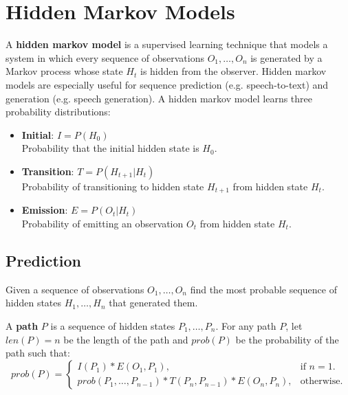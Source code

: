\documentclass[../main.tex]{subfiles}
\begin{document}
\section{Hidden Markov Models}

\begin{definition}
A \textbf{hidden markov model} is a supervised learning technique that models a system in which every sequence of observations $O_1, \ldots, O_n$ is generated by a Markov process whose state $H_t$ is hidden from the observer. Hidden markov models are especially useful for sequence prediction (e.g. speech-to-text) and generation (e.g. speech generation). A hidden markov model learns three probability distributions:

\begin{itemize}
    \item \textbf{Initial}: $I = P(H_0)$ \\
    Probability that the initial hidden state is $H_0$.
    \item \textbf{Transition}: $T = P(H_{t+1} | H_{t})$ \\
    Probability of transitioning to hidden state $H_{t+1}$ from hidden state $H_t$.
    \item \textbf{Emission}: $E = P(O_{t} | H_{t})$ \\
    Probability of emitting an observation $O_{t}$ from hidden state $H_{t}$.
\end{itemize}

\end{definition}

\subsection{Prediction}
Given a sequence of observations $O_1, \ldots, O_n$ find the most probable sequence of hidden states $H_1, \ldots, H_n$ that generated them.

\begin{definition}
A \textbf{path} $P$ is a sequence of hidden states $P_1, \ldots, P_n$. For any path $P$, let $len(P) = n$ be the length of the path and $prob(P)$ be the probability of the path such that:
\begin{equation*}
  prob(P)=\begin{cases}
    I(P_1) * E(O_1, P_1), & \text{if $n = 1$}.\\
    prob(P_1, \ldots, P_{n-1}) * T(P_n, P_{n-1}) * E(O_n, P_n), & \text{otherwise}.
  \end{cases}
\end{equation*}
\end{definition}
\end{document}
